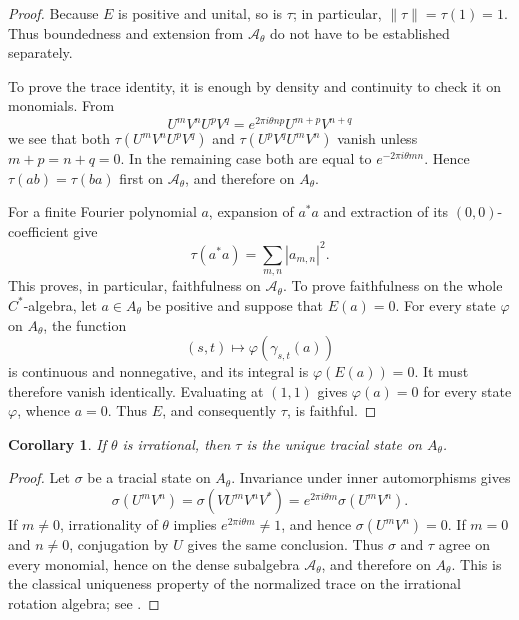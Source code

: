 \documentclass{book}
\newtheorem{corollary}[definition]{Corollary}
\begin{document}
\begin{proof}
Because \(E\) is positive and unital, so is \(\tau\); in particular,
\(\lVert\tau\rVert=\tau(1)=1\). Thus boundedness and extension from
\(\mathcal A_\theta\) do not have to be established separately.

To prove the trace identity, it is enough by density and continuity to
check it on monomials. From
\[
U^mV^nU^pV^q
=
e^{2\pi i\theta np}U^{m+p}V^{n+q}
\]
we see that both
\(\tau(U^mV^nU^pV^q)\) and
\(\tau(U^pV^qU^mV^n)\) vanish unless
\(m+p=n+q=0\). In the remaining case both are equal to
\(e^{-2\pi i\theta mn}\). Hence \(\tau(ab)=\tau(ba)\) first on
\(\mathcal A_\theta\), and therefore on \(A_\theta\).

For a finite Fourier polynomial \(a\), expansion of \(a^*a\) and extraction
of its \((0,0)\)-coefficient give
\[
\tau(a^*a)=\sum_{m,n}|a_{m,n}|^2.
\]
This proves, in particular, faithfulness on \(\mathcal A_\theta\). To prove
faithfulness on the whole \(C^*\)-algebra, let \(a\in A_\theta\) be positive
and suppose that \(E(a)=0\). For every state \(\varphi\) on \(A_\theta\),
the function
\[
(s,t)\longmapsto\varphi(\gamma_{s,t}(a))
\]
is continuous and nonnegative, and its integral is
\(\varphi(E(a))=0\). It must therefore vanish identically. Evaluating at
\((1,1)\) gives \(\varphi(a)=0\) for every state \(\varphi\), whence
\(a=0\). Thus \(E\), and consequently \(\tau\), is faithful.
\end{proof}

\begin{corollary}\label{cor:uniqueTraceIrrationalRotation}
If \(\theta\) is irrational, then \(\tau\) is the unique tracial state on
\(A_\theta\).
\end{corollary}

\begin{proof}
Let \(\sigma\) be a tracial state on \(A_\theta\). Invariance under inner
automorphisms gives
\[
\sigma(U^mV^n)
=
\sigma(VU^mV^nV^*)
=
e^{2\pi i\theta m}\sigma(U^mV^n).
\]
If \(m\ne0\), irrationality of \(\theta\) implies
\(e^{2\pi i\theta m}\ne1\), and hence \(\sigma(U^mV^n)=0\). If \(m=0\)
and \(n\ne0\), conjugation by \(U\) gives the same conclusion. Thus
\(\sigma\) and \(\tau\) agree on every monomial, hence on the dense
subalgebra \(\mathcal A_\theta\), and therefore on \(A_\theta\). This is
the classical uniqueness property of the normalized trace on the
irrational rotation algebra; see \cite[p.~415]{Rieffel1981}.
\end{proof}
\end{document}
